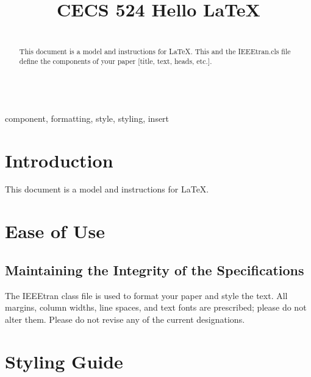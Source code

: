 \documentclass[conference]{IEEEtran}
\begin{document}
\title{CECS 524 Hello \LaTeX} 


\author{
	}

\maketitle

\begin{abstract}
    {\\This document is a model and instructions for \LaTeX. This and the IEEEtran.cls file define the components of your paper [title, text, heads, etc.].}
\end{abstract}

\begin{IEEEkeywords}    
    {\\component, formatting, style, styling, insert}
\end{IEEEkeywords}

\section{Introduction}
    {This document is a model and instructions for \LaTeX. }

\section{Ease of Use}

\subsection{Maintaining the Integrity of the Specifications}

    { The IEEEtran class file is used to format your paper and style the text. All margins, column widths, line spaces, and text fonts are prescribed; please do not alter them. Please do not revise any of the current designations.}

\section{Styling Guide}
\end{document}
